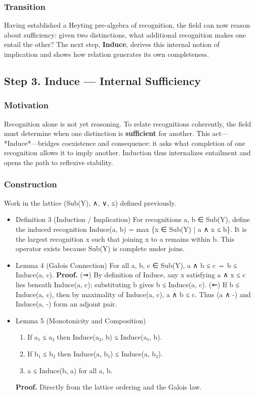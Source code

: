 \documentclass[11pt]{article}
\begin{document}
\subsubsection*{Transition}
\label{sec:org9b00597}
Having established a Heyting pre-algebra of recognition, the field can now reason about sufficiency: given two distinctions, what additional recognition makes one entail the other?  
The next step, \textbf{Induce}, derives this internal notion of implication and shows how relation generates its own completeness.
\subsection*{Step 3. Induce — Internal Sufficiency}
\label{sec:org94bbe9c}

\subsubsection*{Motivation}
\label{sec:org602c21e}
Recognition alone is not yet reasoning.  
To relate recognitions coherently, the field must determine when one distinction is \textbf{sufficient} for another.  
This act—*Induce*—bridges coexistence and consequence:  
it asks what completion of one recognition allows it to imply another.  
Induction thus internalizes entailment and opens the path to reflexive stability.
\subsubsection*{Construction}
\label{sec:org83d3ae2}
Work in the lattice (Sub(Y), ∧, ∨, ≤) defined previously.
\begin{itemize}
\item Definition 3 (Induction / Implication)
\label{sec:orgc523b8c}
For recognitions a, b ∈ Sub(Y), define the induced recognition  
Induce(a, b) = max \{x ∈ Sub(Y) | a ∧ x ≤ b\}.  
It is the largest recognition x such that joining x to a remains within b.  
This operator exists because Sub(Y) is complete under joins.
\item Lemma 4 (Galois Connection)
\label{sec:org8ceb561}
For all a, b, c ∈ Sub(Y),  
a ∧ b ≤ c  ⇔  b ≤ Induce(a, c).  
\textbf{Proof.}  
(⇒) By definition of Induce, any x satisfying a ∧ x ≤ c lies beneath Induce(a, c); substituting b gives b ≤ Induce(a, c).  
(⇐) If b ≤ Induce(a, c), then by maximality of Induce(a, c), a ∧ b ≤ c.  
Thus (a ∧ -) and Induce(a, -) form an adjoint pair.
\item Lemma 5 (Monotonicity and Composition)
\label{sec:org733e40f}
\begin{enumerate}
\item If a₁ ≤ a₂ then Induce(a₂, b) ≤ Induce(a₁, b).
\item If b₁ ≤ b₂ then Induce(a, b₁) ≤ Induce(a, b₂).
\item a ≤ Induce(b, a) for all a, b.
\end{enumerate}
\textbf{Proof.}  Directly from the lattice ordering and the Galois law.
\end{itemize}
\end{document}
